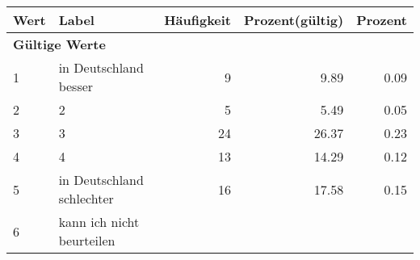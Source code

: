      \begin{longtable}{lXrrr}
     \toprule
     \textbf{Wert} & \textbf{Label} & \textbf{Häufigkeit} & \textbf{Prozent(gültig)} & \textbf{Prozent} \\
     \endhead
     \midrule
     \multicolumn{5}{l}{\textbf{Gültige Werte}}\\

     1 &
     \multicolumn{1}{X}{ in Deutschland besser   } &


       \num{9} &
       \num[round-mode=places,round-precision=2]{9.89} &
         \num[round-mode=places,round-precision=2]{0.09} \\

     2 &
     \multicolumn{1}{X}{ 2   } &


       \num{5} &
       \num[round-mode=places,round-precision=2]{5.49} &
         \num[round-mode=places,round-precision=2]{0.05} \\

     3 &
     \multicolumn{1}{X}{ 3   } &


       \num{24} &
       \num[round-mode=places,round-precision=2]{26.37} &
         \num[round-mode=places,round-precision=2]{0.23} \\

     4 &
     \multicolumn{1}{X}{ 4   } &


       \num{13} &
       \num[round-mode=places,round-precision=2]{14.29} &
         \num[round-mode=places,round-precision=2]{0.12} \\

     5 &
     \multicolumn{1}{X}{ in Deutschland schlechter   } &


       \num{16} &
       \num[round-mode=places,round-precision=2]{17.58} &
         \num[round-mode=places,round-precision=2]{0.15} \\

     6 &
     \multicolumn{1}{X}{ kann ich nicht beurteilen   } &



\end{longtable}
